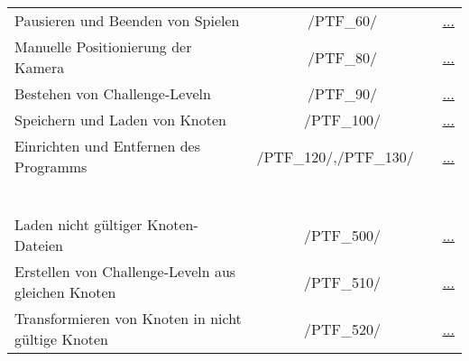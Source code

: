 \begin{longtable}{p{0.5\hsize}p{0.275\hsize}p{0.275\hsize}}
	\\
	
	  \multicolumn{1}{L{6.5cm}}{Pausieren und Beenden von Spielen}
	& \multicolumn{1}{c}{/PTF\_60/}
	& \multicolumn{1}{c}{\hyperref[]{...}}
	
	\\
	
	  \multicolumn{1}{L{6.5cm}}{Manuelle Positionierung der Kamera}
	& \multicolumn{1}{c}{/PTF\_80/}
	& \multicolumn{1}{c}{\hyperref[]{...}}
	
	\\
	
	  \multicolumn{1}{L{6.5cm}}{Bestehen von Challenge-Leveln}
	& \multicolumn{1}{c}{/PTF\_90/}
	& \multicolumn{1}{c}{\hyperref[]{...}}
	
	\\
	
	  \multicolumn{1}{L{6.5cm}}{Speichern und Laden von Knoten}
	& \multicolumn{1}{c}{/PTF\_100/}
	& \multicolumn{1}{c}{\hyperref[]{...}}
	
	\\
	
	  \multicolumn{1}{L{6.5cm}}{Einrichten und Entfernen des Programms}
	& \multicolumn{1}{C{3cm}}{/PTF\_120/,\newline/PTF\_130/~~}
	& \multicolumn{1}{c}{\hyperref[]{...}}
	
	\\
	


\newpage




	  \multicolumn{3}{l}{\textbf{Negativtests:}}
	  
	\\
	
	  \multicolumn{3}{l}{~}
	  
	\\
	
	  \multicolumn{1}{L{6.5cm}}{Laden nicht gültiger Knoten-Dateien}
	& \multicolumn{1}{c}{/PTF\_500/}
	& \multicolumn{1}{c}{\hyperref[]{...}}
	
	\\
	
	  \multicolumn{1}{L{6.5cm}}{Erstellen von Challenge-Leveln aus gleichen Knoten}
	& \multicolumn{1}{c}{/PTF\_510/}
	& \multicolumn{1}{c}{\hyperref[]{...}}
	
	\\
	
	  \multicolumn{1}{L{6.5cm}}{Transformieren von Knoten in nicht gültige Knoten}
	& \multicolumn{1}{c}{/PTF\_520/}
	& \multicolumn{1}{c}{\hyperref[]{...}}
	

\end{longtable}
